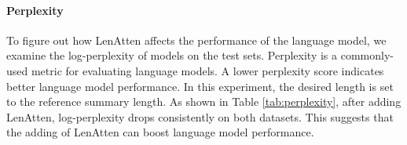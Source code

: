 \documentclass[11pt,a4paper]{article}
\begin{document}
\paragraph{Perplexity}
\begin{table}[t]
\centering
\caption{Test perplexity of models on the CNN/DM dataset and the AEG dataset.}
\label{tab:perplexity}
\end{table}
To figure out how LenAtten affects the performance of the language model, we examine the log-perplexity of models on the test sets. Perplexity is a commonly-used metric for evaluating language models. A lower perplexity score indicates better language model performance. In this experiment, the desired length is set to the reference summary length. As shown in Table \ref{tab:perplexity}, after adding LenAtten, log-perplexity drops consistently on both datasets. This suggests that the adding of LenAtten can boost language model performance.
\end{document}
